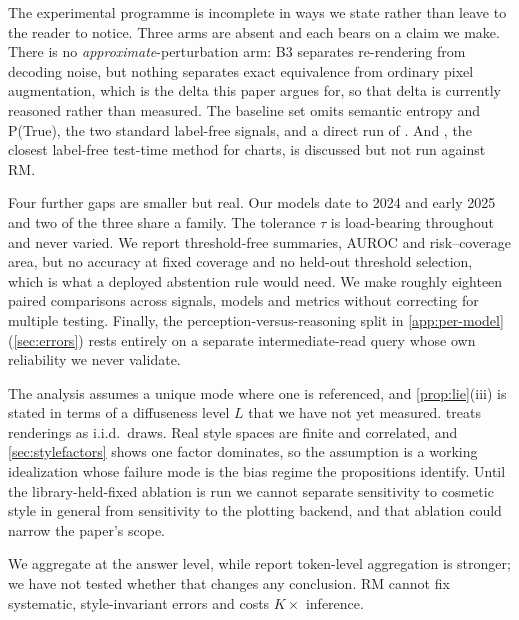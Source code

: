\documentclass[11pt]{article}
\newcommand{\rmg}{\mathrm{RM}}
\begin{document}
The experimental programme is incomplete in ways we state rather than leave to the reader to notice. Three arms are absent and each bears on a claim we make. There is no \emph{approximate}-perturbation arm: B3 separates re-rendering from decoding noise, but nothing separates exact equivalence from ordinary pixel augmentation, which is the delta this paper argues for, so that delta is currently reasoned rather than measured. The baseline set omits semantic entropy \citep{kuhn2023semantic,farquhar2024semantic} and P(True), the two standard label-free signals, and a direct run of \citet{zhang2024vluncertainty}. And \citet{jiang2025chartcoca}, the closest label-free test-time method for charts, is discussed but not run against $\rmg$.

Four further gaps are smaller but real. Our models date to 2024 and early 2025 and two of the three share a family. The tolerance $\tau$ is load-bearing throughout and never varied. We report threshold-free summaries, AUROC and risk--coverage area, but no accuracy at fixed coverage and no held-out threshold selection, which is what a deployed abstention rule would need. We make roughly eighteen paired comparisons across signals, models and metrics without correcting for multiple testing. Finally, the perception-versus-reasoning split in \cref{app:per-model} (\cref{sec:errors}) rests entirely on a separate intermediate-read query whose own reliability we never validate.

The analysis assumes a unique mode where one is referenced, and \cref{prop:lie}(iii) is stated in terms of a diffuseness level $L$ that we have not yet measured.  treats renderings as i.i.d.\ draws. Real style spaces are finite and correlated, and \cref{sec:stylefactors} shows one factor dominates, so the assumption is a working idealization whose failure mode is the bias regime the propositions identify. Until the library-held-fixed ablation is run we cannot separate sensitivity to cosmetic style in general from sensitivity to the plotting backend, and that ablation could narrow the paper's scope.

We aggregate at the answer level, while \citet{kaya2026efficient} report token-level aggregation is stronger; we have not tested whether that changes any conclusion. $\rmg$ cannot fix systematic, style-invariant errors and costs $K\times$ inference.
\end{document}
